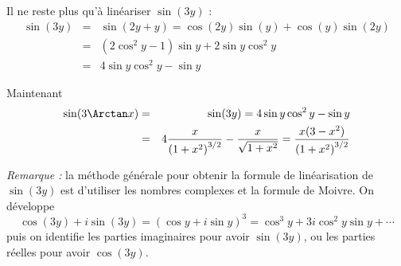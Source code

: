 {\begin{enumerate}
{Il ne reste plus qu'à linéariser $\sin(3y)$ :
\begin{eqnarray*}
\sin(3y) &=& \sin(2y+y)=\cos(2y)\sin(y)+\cos(y)\sin(2y)\\
 &=&(2\cos^2 y-1)\sin y +2\sin y\cos^2y\\
 &=&4 \sin y \cos^2 y - \sin y
\end{eqnarray*}



Maintenant
\begin{eqnarray*}
\sin(3\Arctan x) &=& \sin(3y)= 4 \sin y \cos^2 y - \sin y\\
 &=& 4{\frac {x}{\left (1+{x}^{2}\right )^{3/2}}}-{\frac {x}{\sqrt {1+{x}^{2}}}}={\frac {x(3-x^2)}{\left (1+{x}^{2}\right )^{3/2}}}
\end{eqnarray*}

\bigskip

\emph{Remarque :} la méthode générale pour obtenir la formule de linéarisation de $\sin(3y)$ est 
d'utiliser les nombres complexes
et la formule de Moivre. On développe 
$$\cos(3y) + i \sin(3y) = (\cos y + i \sin y)^3 = \cos^3 y + 3i\cos^2y \sin y + \cdots$$ 
puis on identifie les parties imaginaires pour avoir $\sin(3y)$, 
ou les parties réelles pour avoir $\cos(3y)$.}
\end{enumerate}
}
